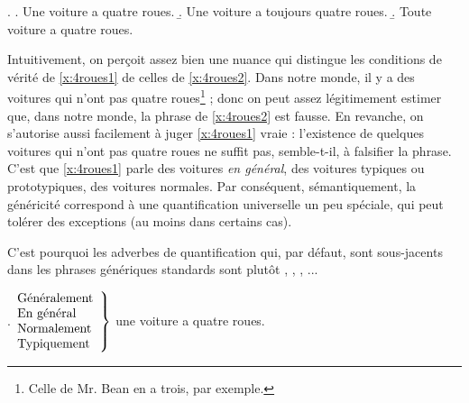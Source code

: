 \ex.
\a. Une voiture a quatre roues. \label{x:4roues1}
\b. Une voiture a toujours quatre roues. \label{x:4roues2}
\b. Toute voiture a quatre roues. \label{x:4roues3}


Intuitivement, on perçoit assez bien une nuance qui distingue les
conditions de vérité de \ref{x:4roues1} de celles de
\ref{x:4roues2}. Dans notre monde, il y a des voitures qui n'ont pas
quatre roues\footnote{Celle de Mr. Bean en a trois, par exemple.} ;
donc on peut assez légitimement estimer que, dans notre monde, la
phrase de \ref{x:4roues2} est fausse.  En revanche, on s'autorise
aussi facilement à juger \ref{x:4roues1} vraie : l'existence de
quelques voitures qui n'ont pas quatre roues ne suffit pas,
semble-t-il, à falsifier la phrase. C'est que \ref{x:4roues1} parle
des voitures \emph{en général}, des voitures typiques ou prototypiques, des
voitures normales. Par conséquent, sémantiquement, la généricité
correspond à une quantification universelle un peu spéciale, qui
peut tolérer des exceptions (au moins dans certains cas). 

C'est pourquoi les adverbes  de quantification qui, par défaut, sont
sous-jacents dans les phrases génériques standards sont plutôt
,  
, , ... 


\ex. \label{x:AdvGen}
\(\left.\begin{array}{@{}l}
\text{Généralement} \\ \text{En général} \\ \text{Normalement} 
\\ \text{Typiquement}
\end{array}\right\}\)
une voiture a quatre roues.


